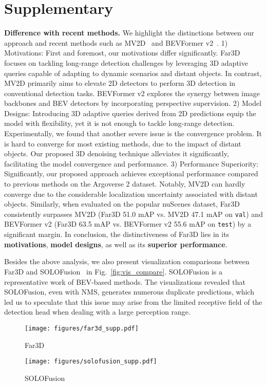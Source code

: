 \documentclass[letterpaper]{article} \usepackage{aaai24}
\begin{document}


\newpage
\section{Supplementary}
\noindent\textbf{Difference with recent methods.}
We highlight the distinctions between our approach and recent methods such as MV2D~\cite{wang2023object} and BEVFormer v2~\cite{yang2023bevformer}.
1) Motivations: First and foremost, our motivations differ significantly. Far3D focuses on tackling long-range detection challenges by leveraging 3D adaptive queries capable of adapting to dynamic scenarios and distant objects. In contrast, MV2D primarily aims to elevate 2D detectors to perform 3D detection in conventional detection tasks. BEVFormer v2 explores the synergy between image backbones and BEV detectors by incorporating perspective supervision.
2) Model Designs: Introducing 3D adaptive queries derived from 2D predictions equip the model with flexibility, yet it is not enough to tackle long-range detection. Experimentally, we found that another severe issue is the convergence problem. It is hard to converge for most existing methods, due to the impact of distant objects. Our proposed 3D denoising technique alleviates it significantly, facilitating the model convergence and performance.
3) Performance Superiority: Significantly, our proposed approach achieves exceptional performance compared to previous methods on the Argoverse 2 dataset. Notably, MV2D can hardly converge due to the considerable localization uncertainty associated with distant objects. Similarly, when evaluated on the popular nuScenes dataset, Far3D consistently surpasses MV2D (Far3D 51.0 mAP vs. MV2D 47.1 mAP on \texttt{val}) and BEVFormer v2 (Far3D 63.5 mAP vs. BEVFormer v2 55.6 mAP on \texttt{test}) by a significant margin.
In conclusion, the distinctiveness of Far3D lies in its \textbf{motivations}, \textbf{model designs}, as well as its \textbf{superior performance}.


Besides the above analysis, we also present visualization comparisons between Far3D and SOLOFusion~\cite{park2022time} in Fig.~\ref{fig:vis_compare}. SOLOFusion is a representative work of BEV-based methods. The visualizations revealed that SOLOFusion, even with NMS, generates numerous duplicate predictions, which led us to speculate that this issue may arise from the limited receptive field of the detection head when dealing with a large perception range.
\begin{figure*}[htb!]
  \centering
  \begin{subfigure}{0.4\textwidth}
    \centering
    \texttt{[image: figures/far3d\_supp.pdf]}
    \caption{Far3D}
\end{subfigure}
\begin{subfigure}{0.4\textwidth}
    \centering
    \texttt{[image: figures/solofusion\_supp.pdf]}
    \caption{SOLOFusion}
\end{subfigure}
  \caption{Visulization results of Far3D and SOLOFusion.}
  \label{fig:vis_compare}
\end{figure*}
\end{document}
